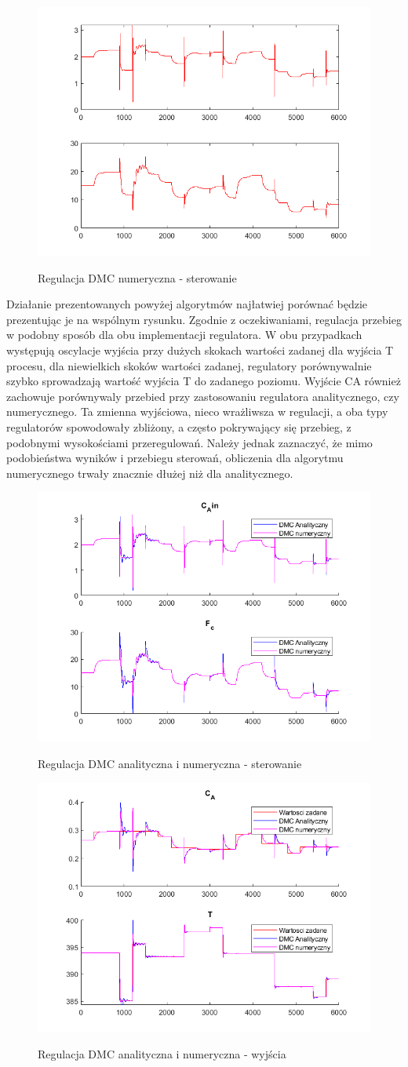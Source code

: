 \begin{figure}[h!]
	\centering
	\includegraphics[width=.6\linewidth]{img/uDMCnum.png}
	\label{ch2:Zadanie}
	\caption{Regulacja DMC numeryczna - sterowanie}
\end{figure}
\newpage
Działanie prezentowanych powyżej algorytmów najłatwiej porównać będzie prezentując je na wspólnym rysunku. 
Zgodnie z oczekiwaniami, regulacja przebieg w podobny sposób dla obu implementacji regulatora. W obu przypadkach występują oscylacje wyjścia przy dużych skokach wartości zadanej dla wyjścia T procesu, dla niewielkich skoków wartości zadanej, regulatory porównywalnie szybko sprowadzają wartość wyjścia T do zadanego poziomu. Wyjście CA również zachowuje porównywaly przebied przy zastosowaniu regulatora analitycznego, czy numerycznego. Ta zmienna wyjściowa, nieco wrażliwsza w regulacji, a oba typy regulatorów spowodowały zbliżony, a często pokrywający się przebieg, z podobnymi wysokościami przeregulowań.
Należy jednak zaznaczyć, że mimo podobieństwa wyników i przebiegu sterowań, obliczenia dla algorytmu numerycznego trwały znacznie dłużej niż dla analitycznego.
\begin{figure}[h!]
	\centering
	\includegraphics[width=.6\linewidth]{img/uComparedDMC.png}
	\label{ch2:Zadanie}
	\caption{Regulacja DMC analityczna i numeryczna - sterowanie}
\end{figure}
\begin{figure}[h!]
	\centering
	\includegraphics[width=.6\linewidth]{img/yComparedDMC.png}
	\label{ch2:Zadanie}
	\caption{Regulacja DMC analityczna i numeryczna - wyjścia}
\end{figure}